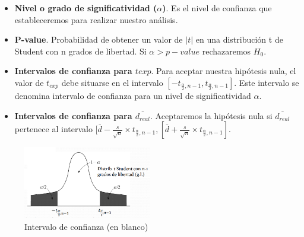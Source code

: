 \documentclass[12pt,spanish]{article}
\begin{document}
\begin{itemize}
	\item \textbf{Nivel o grado de significatividad ($\alpha$)}. Es el nivel de confianza que estableceremos para realizar nuestro análisis.
	\item \textbf{P-value}. Probabilidad de obtener un valor de $|t|$ en una distribución t de Student con n grados de libertad. Si $\alpha>p-value$ rechazaremos $H_0$.
	\item \textbf{Intervalos de confianza para $t{exp}$}. Para aceptar nuestra hipótesis nula, el valor de $t_{exp}$ debe situarse en el intervalo $[-t_{\frac{\alpha}{2},n-1}, t_{\frac{\alpha}{2},n-1}]$. Este intervalo se denomina intervalo de confianza para un nivel de significatividad $\alpha$.
	\item \textbf{Intervalos de confianza para $\overline{d_{real}}$}. Aceptaremos la hipótesis nula si $\overline{d_{real}}$ pertenece al intervalo $[\overline{d}-\frac{s}{\sqrt{n}} \times t_{\frac{\alpha}{2},n-1}, [\overline{d}+\frac{s}{\sqrt{n}} \times t_{\frac{\alpha}{2},n-1}]$.
\end{itemize}

\begin{figure}[H]
	\centering
	\includegraphics[width=0.5\textwidth]{intconf.png}
	\caption{Intervalo de confianza (en blanco)}
\end{figure}
\end{document}
